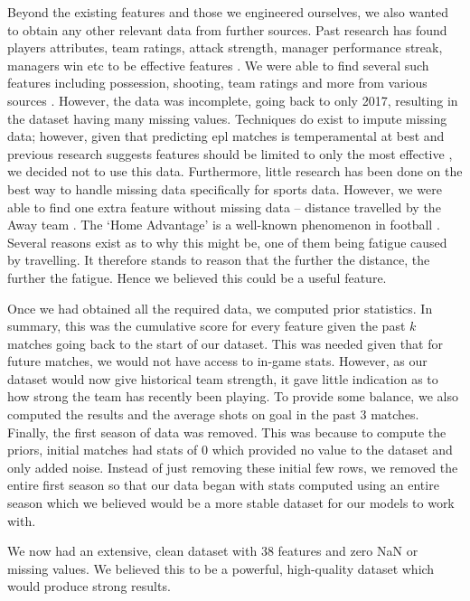 \documentclass{article}
\begin{document}
Beyond the existing features and those we engineered ourselves, we also wanted to obtain any other relevant data from further sources. Past research has found players attributes, team ratings, attack strength, manager performance streak, managers win etc to be effective features \cite{fialho2019predicting, bunker2019machine}. We were able to find several such features including possession, shooting, team ratings and more from various sources \cite{fbref,whoscored}. However, the data was incomplete, going back to only 2017, resulting in the dataset having many missing values. Techniques do exist to impute missing data; however, given that predicting \gls{epl} matches is temperamental at best and previous research suggests features should be limited to only the most effective \cite{horvat2020use}, we decided not to use this data. Furthermore, little research has been done on the best way to handle missing data specifically for sports data. However, we were able to find one extra feature without missing data – distance travelled by the Away team \cite{Kampscshmidtrepo}. The ‘Home Advantage’ is a well-known phenomenon in football \cite{horvat2020use}. Several reasons exist as to why this might be, one of them being fatigue caused by travelling. It therefore stands to reason that the further the distance, the further the fatigue. Hence we believed this could be a useful feature.

Once we had obtained all the required data, we computed prior statistics. In summary, this was the cumulative score for every feature given the past $k$ matches going back to the start of our dataset. This was needed given that for future matches, we would not have access to in-game stats. However, as our dataset would now give historical team strength, it gave little indication as to how strong the team has recently been playing. To provide some balance, we also computed the results and the average shots on goal in the past 3 matches. Finally, the first season of data was removed. This was because to compute the priors, initial matches had stats of 0 which provided no value to the dataset and only added noise. Instead of just removing these initial few rows, we removed the entire first season so that our data began with stats computed using an entire season which we believed would be a more stable dataset for our models to work with. 

We now had an extensive, clean dataset with 38 features and zero NaN or missing values. We believed this to be a powerful, high-quality dataset which would produce strong results. 
\end{document}
